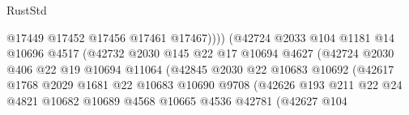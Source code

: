\begin{lexlean}{RustStd}
\begin{coremodule}
                                            @17449
                                            @17452
                                            @17456
                                            @17461
                                            @17467))))
                                    (@42724
                                      @2033
                                      @104
                                      @1181
                                      @14
                                      @10696
                                      @4517
                                      (@42732
                                        @2030
                                        @145
                                        @22
                                        @17
                                        @10694
                                        @4627
                                        (@42724
                                          @2030
                                          @406
                                          @22
                                          @19
                                          @10694
                                          @11064
                                          (@42845
                                            @2030
                                            @22
                                            @10683
                                            @10692
                                            (@42617
                                              @1768
                                              @2029
                                              @1681
                                              @22
                                              @10683
                                              @10690
                                              @9708
                                              (@42626
                                                @193
                                                @211
                                                @22
                                                @24
                                                @4821
                                                @10682
                                                @10689
                                                @4568
                                                @10665
                                                @4536
                                                @42781
                                                (@42627
                                                  @104

\end{coremodule}
\end{lexlean}
